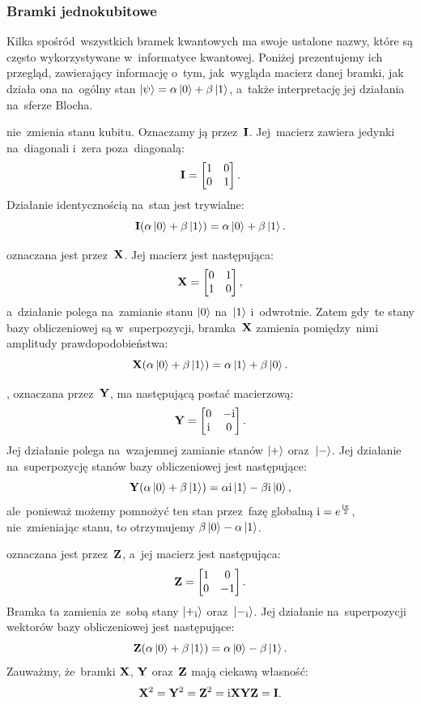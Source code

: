 \subsubsection{Bramki jednokubitowe}
Kilka spośród~wszystkich bramek kwantowych ma swoje ustalone nazwy, które są
często wykorzystywane w~informatyce kwantowej. Poniżej prezentujemy ich przegląd,
zawierający informację o~tym, jak~wygląda macierz danej bramki, jak działa ona
na~ogólny stan $\ket{\psi}=\alpha\ket{0} + \beta\ket{1}$, a~także
interpretację jej działania na~sferze Blocha.

 nie~zmienia stanu kubitu.
Oznaczamy ją przez~$\mathbf{I}$. Jej~macierz zawiera jedynki na~diagonali i~zera poza~diagonalą:
$$\mathbf{I}=\begin{bmatrix} 1 & 0 \\ 0 & 1\end{bmatrix}.$$
Działanie identycznością na~stan jest trywialne:
$$\mathbf{I}(\alpha\ket{0} + \beta\ket{1}) = \alpha\ket{0} + \beta\ket{1}.$$

oznaczana jest przez~$\mathbf{X}$. Jej macierz jest następująca:
$$\mathbf{X}=\begin{bmatrix} 0 & 1 \\ 1 & 0\end{bmatrix},$$
a~działanie polega na~zamianie stanu $\ket{0}$ na~$\ket{1}$
i~odwrotnie. Zatem gdy~te stany bazy obliczeniowej są w~superpozycji,
bramka~$\mathbf{X}$ zamienia pomiędzy~nimi amplitudy prawdopodobieństwa:
$$\mathbf{X} (\alpha\ket{0} + \beta\ket{1}) = \alpha\ket{1} + \beta\ket{0}.$$

, oznaczana przez~$\mathbf{Y}$,
ma następującą postać macierzową:
$$\mathbf{Y} = \begin{bmatrix} 0&-{\mathrm i}\\ {\mathrm i}&0 \end{bmatrix}.$$
Jej działanie polega na~wzajemnej zamianie stanów $\ket{+}$ oraz~$\ket{-}$.
Jej działanie na~superpozycję stanów bazy obliczeniowej jest następujące:
$$\mathbf{Y} (\alpha\ket{0} + \beta\ket{1}) = \alpha{\mathrm i}\ket{1} - \beta{\mathrm i} \ket{0},$$
ale~ponieważ możemy pomnożyć ten stan przez~fazę globalną ${\mathrm i}=e^{\frac{{\mathrm i} \pi}{2}}$, nie~zmieniając
stanu, to otrzymujemy $\beta\ket{0}-\alpha\ket{1}$.

 oznaczana jest przez~$\mathbf{Z}$,
a~jej macierz jest następująca:
$$\mathbf{Z} = \begin{bmatrix} 1 & 0 \\ 0 & -1\end{bmatrix}.$$
Bramka ta zamienia ze~sobą stany $\ket{+_{\mathrm i}}$ oraz~$\ket{-_{\mathrm i}}$.
Jej działanie na~superpozycji wektorów bazy obliczeniowej jest następujące:
$$\mathbf{Z} (\alpha\ket{0} + \beta\ket{1}) = \alpha\ket{0} - \beta\ket{1}.$$
Zauważmy, że~bramki $\mathbf{X}$, $\mathbf{Y}$ oraz~$\mathbf{Z}$ mają ciekawą własność:
$$\mathbf{X}^2=\mathbf{Y}^2=\mathbf{Z}^2={\mathrm i}\mathbf{X}\mathbf{Y}\mathbf{Z}=\mathbf{I}.$$

